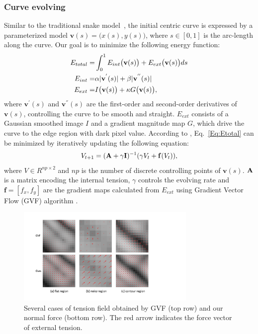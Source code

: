 \subsubsection{Curve evolving}
\label{sec:curve_evolving}


Similar to the traditional snake model~\cite{Kass1988}, the initial centric curve is expressed by a parameterized model $\mathbf{v}(s)=\big(x(s),y(s)\big)$, where $s\in[0,1]$ is the arc-length along the curve.
Our goal is to minimize the following energy function:
\begin{eqnarray}\label{Eq:Etotal}
E_{total} =&\int_{0}^{1} E_{int}\big( \mathbf{v}(s) \big)+ E_{ext}\big( \mathbf{v}(s)\big) ds\nonumber \\
E_{int} = & \alpha|\mathbf{v}^{'}(s)|+\beta|\mathbf{v}^{''}(s)| \\\nonumber
E_{ext} =& I\big( \mathbf{v}(s)\big) + \kappa G\big(\mathbf{v}(s)\big),\nonumber
\end{eqnarray}
where $\mathbf{v}^{'}(s)$ and $\mathbf{v}^{''}(s)$ are the first-order and second-order derivatives of $\mathbf{v}(s)$, controlling the curve to be smooth and straight.
$E_{ext}$ consists of a Gaussian smoothed image $I$ and a gradient magnitude map $G$, which drive the curve to the edge region with dark pixel value.  
According to \cite{Kass1988}, Eq.~\ref{Eq:Etotal} can be minimized by iteratively updating the following equation:
\begin{eqnarray}\label{Eq:GVF}
V_{t+1} = (\mathbf{A}+\gamma \mathbf{I})^{-1}(\gamma V_t+\mathbf{f}(V_t)),
\end{eqnarray}
where $V\in R^{np\times2}$ and $np$ is the number of discrete controlling points of $\mathbf{v}(s)$.
$\mathbf{A}$ is a matrix encoding the internal tension, $\gamma$ controls the evolving rate and $\mathbf{f}=[f_{x},f_{y}]$ are the gradient maps calculated from $E_{ext}$ using Gradient Vector Flow (GVF) algorithm \cite{Xu1998}.

\begin{figure}[t]
	\begin{center}
		\includegraphics[width=3.4in]{figs/FigGVF.pdf}
	\end{center}
	\caption{Several cases of tension field obtained by GVF (top row) and our normal force (bottom row). The red arrow indicates the force vector of external tension.}
	\label{fig:gvf}
\end{figure}

